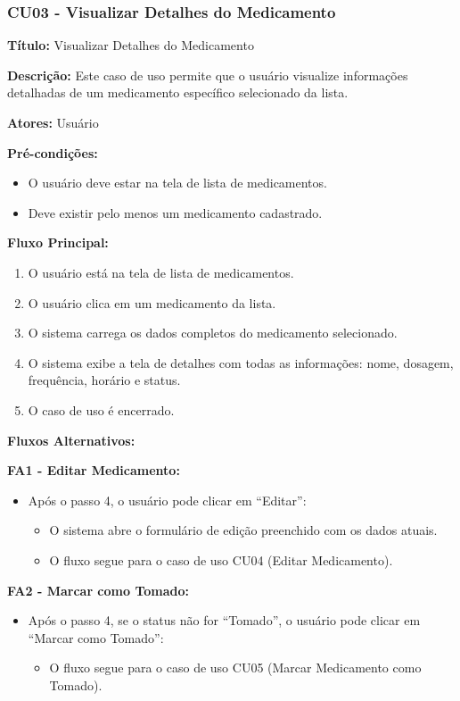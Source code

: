 \documentclass[12pt]{article}
\begin{document}
\subsubsection{CU03 - Visualizar Detalhes do Medicamento}

\textbf{Título:} Visualizar Detalhes do Medicamento

\textbf{Descrição:} Este caso de uso permite que o usuário visualize informações detalhadas de um medicamento específico selecionado da lista.

\textbf{Atores:} Usuário

\textbf{Pré-condições:}
\begin{itemize}
    \item O usuário deve estar na tela de lista de medicamentos.
    \item Deve existir pelo menos um medicamento cadastrado.
\end{itemize}

\textbf{Fluxo Principal:}
\begin{enumerate}
    \item O usuário está na tela de lista de medicamentos.
    \item O usuário clica em um medicamento da lista.
    \item O sistema carrega os dados completos do medicamento selecionado.
    \item O sistema exibe a tela de detalhes com todas as informações: nome, dosagem, frequência, horário e status.
    \item O caso de uso é encerrado.
\end{enumerate}

\textbf{Fluxos Alternativos:}

\textbf{FA1 - Editar Medicamento:}
\begin{itemize}
    \item Após o passo 4, o usuário pode clicar em ``Editar'':
    \begin{itemize}
        \item O sistema abre o formulário de edição preenchido com os dados atuais.
        \item O fluxo segue para o caso de uso CU04 (Editar Medicamento).
    \end{itemize}
\end{itemize}

\textbf{FA2 - Marcar como Tomado:}
\begin{itemize}
    \item Após o passo 4, se o status não for ``Tomado'', o usuário pode clicar em ``Marcar como Tomado'':
    \begin{itemize}
        \item O fluxo segue para o caso de uso CU05 (Marcar Medicamento como Tomado).
    \end{itemize}
\end{itemize}
\end{document}
